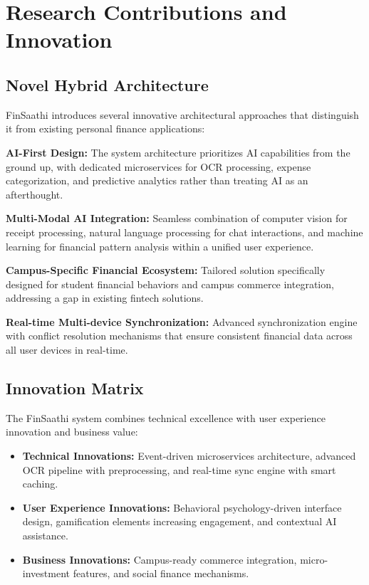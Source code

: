 \documentclass[10pt,twocolumn,twoside,a4paper]{article}
\begin{document}
\section{Research Contributions and Innovation}
\subsection{Novel Hybrid Architecture}
FinSaathi introduces several innovative architectural approaches that distinguish it from existing personal finance applications:

\textbf{AI-First Design:} The system architecture prioritizes AI capabilities from the ground up, with dedicated microservices for OCR processing, expense categorization, and predictive analytics rather than treating AI as an afterthought.

\textbf{Multi-Modal AI Integration:} Seamless combination of computer vision for receipt processing, natural language processing for chat interactions, and machine learning for financial pattern analysis within a unified user experience.

\textbf{Campus-Specific Financial Ecosystem:} Tailored solution specifically designed for student financial behaviors and campus commerce integration, addressing a gap in existing fintech solutions.

\textbf{Real-time Multi-device Synchronization:} Advanced synchronization engine with conflict resolution mechanisms that ensure consistent financial data across all user devices in real-time.

\subsection{Innovation Matrix}
The FinSaathi system combines technical excellence with user experience innovation and business value:
\begin{itemize}[leftmargin=*]
  \item \textbf{Technical Innovations:} Event-driven microservices architecture, advanced OCR pipeline with preprocessing, and real-time sync engine with smart caching.
  \item \textbf{User Experience Innovations:} Behavioral psychology-driven interface design, gamification elements increasing engagement, and contextual AI assistance.
  \item \textbf{Business Innovations:} Campus-ready commerce integration, micro-investment features, and social finance mechanisms.
\end{itemize}
\end{document}
